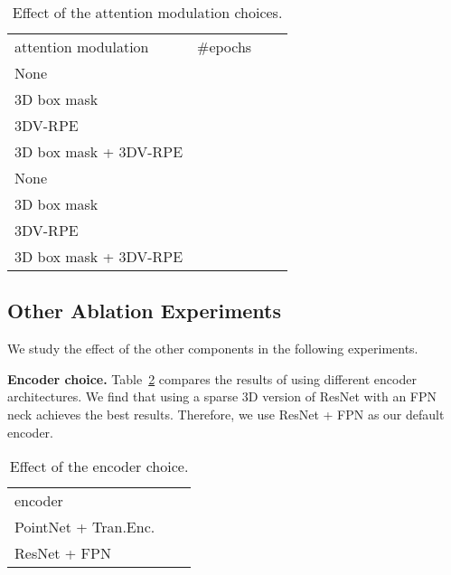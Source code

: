 \documentclass[10pt,twocolumn,letterpaper]{article}
\begin{document}
\begin{table}[t]
\footnotesize
\renewcommand{\arraystretch}{1.2}
\centering
\begin{minipage}{1\linewidth}{\begin{center}
\setlength{\tabcolsep}{12pt}
\resizebox{1.0\linewidth}{!}
{
\begin{tabular}{l|ccc}
   attention modulation & \#epochs &   &  \\
    \shline
    None &  &  &  \\ 
    3D box mask  &  &  &  \\ 
    \rowcolor{gray!10}3DV-RPE  &  &  &  \\
    3D box mask + 3DV-RPE  &  &  & \\ \hline
    None  &  &  &  \\ 
    3D box mask   &  &  &  \\ 
    \rowcolor{gray!10}3DV-RPE  &  &  & \\
    3D box mask + 3DV-RPE  &  & & \\ 
\end{tabular}
}
\end{center}}
\end{minipage}
\caption{\small Effect of the attention modulation choices.}
\label{tab:effect_cross_attn}
\end{table}


\subsection{Other Ablation Experiments}
We study the effect of the other components in the following experiments.

\vspace{1mm}
\noindent \textbf{Encoder choice.}
Table~\ref{tab:effect_backbone} compares the results of using different encoder architectures. We find that using a sparse 3D version of ResNet with an FPN neck achieves the best results. Therefore, we use ResNet + FPN as our default encoder.
\begin{table}[t]
\footnotesize
\renewcommand{\arraystretch}{1.2}
\centering
\begin{minipage}{1\linewidth}
{\begin{center}
\resizebox{1.0\linewidth}{!}
{
\begin{tabular}{l|cc}
   encoder  &  &  \\
    \shline
   PointNet + Tran.Enc. &  &  \\ 
   \rowcolor{gray!10}ResNet + FPN &  &  \\ 
\end{tabular}
}
\end{center}}
\end{minipage}
\caption{\small Effect of the encoder choice.}
\label{tab:effect_backbone}
\end{table}
\end{document}
